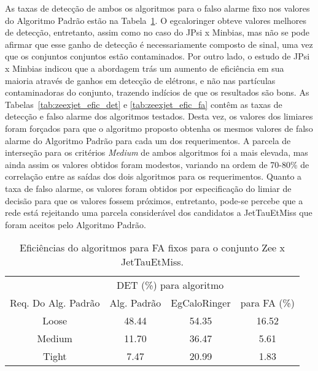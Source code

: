 As taxas de detecção de ambos os algoritmos para o falso alarme fixo nos valores
do Algoritmo Padrão estão na Tabela~\ref{tab:zeexjet_efic}. O \gls{egcaloringer}
obteve valores melhores de detecção, entretanto, assim como no caso do JPsi x
Minbias, mas não se pode afirmar que esse ganho de detecção é necessariamente
composto de sinal, uma vez que os conjuntos conjuntos estão contaminados. Por
outro lado, o estudo de JPsi x Minbias indicou que a abordagem trás um aumento
de eficiência em sua maioria através de ganhos em detecção de elétrons, e não nas
partículas contaminadoras do conjunto, trazendo indícios de que os resultados
são bons. As Tabelas~\ref{tab:zeexjet_efic_det} e \ref{tab:zeexjet_efic_fa}
contêm as taxas de detecção e falso alarme dos algoritmos testados. Desta vez,
os valores dos limiares foram forçados para que o algoritmo proposto obtenha os
mesmos valores de falso alarme do Algoritmo Padrão para cada um dos
requerimentos. A parcela de interseção para os critérios \emph{Medium} de ambos
algoritmos foi a mais elevada, mas ainda assim os valores obtidos foram modestos, 
variando na ordem de 70-80\% de correlação entre as saídas dos dois algoritmos
para os requerimentos. Quanto a taxa de falso alarme, os valores foram obtidos
por especificação do limiar de decisão para que os valores fossem próximos,
entretanto, pode-se percebe que a rede está rejeitando uma parcela considerável
dos candidatos a JetTauEtMiss que foram aceitos pelo Algoritmo Padrão.

\begin{table}[htb]
\centering
\begin{tabular}{cccc}
\hline
\hline
 & 
\multicolumn{2}{c}{DET (\%) para algoritmo} & 
\\
\cline{2-3}
\multirow{-2}{*}{Req. Do Alg. Padrão} & 
Alg. Padrão & 
EgCaloRinger & 
\multirow{-2}{*}{para FA (\%)} \\
\hline
Loose &  48.44 & 54.35 & 16.52 \\
Medium & 11.70 & 36.47 & 5.61 \\
Tight & 7.47 & 20.99 &  1.83 \\
\hline
\hline
\end{tabular}
\caption{Eficiências do algoritmos para FA fixos para o conjunto Zee x JetTauEtMiss.}
\label{tab:zeexjet_efic}
\end{table}

